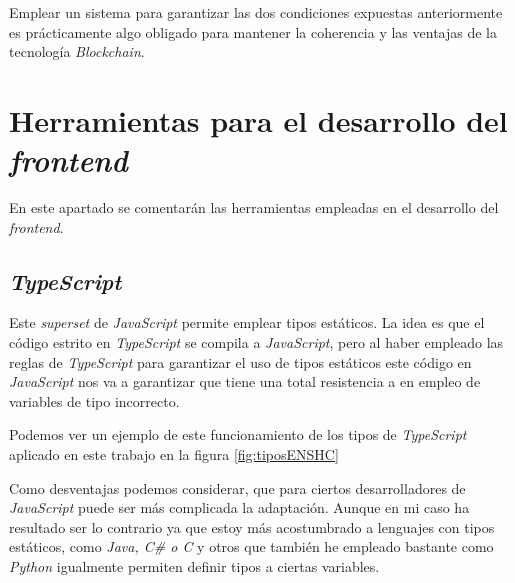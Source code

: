 Emplear un sistema para garantizar las dos condiciones expuestas anteriormente es prácticamente algo obligado para mantener la coherencia y las ventajas de la tecnología \textit{Blockchain}.

\section{Herramientas para el desarrollo del \textit{frontend}}
En este apartado se comentarán las herramientas empleadas en el desarrollo del \textit{frontend}.

\subsection{\textit{TypeScript}}
Este  \textit{superset}\cite{typescriptlangDocumentationBasics} de \textit{JavaScript} permite emplear tipos estáticos. La idea es que el código estrito en \textit{TypeScript} se compila a \textit{JavaScript}, pero al haber empleado las reglas de \textit{TypeScript} para garantizar el uso de tipos estáticos este código en \textit{JavaScript} nos va a garantizar que tiene una total resistencia a en empleo de variables de tipo incorrecto. 


Podemos ver un ejemplo de este funcionamiento de los tipos de \textit{TypeScript} aplicado en este trabajo en la figura \ref{fig:tiposENSHC}

Como desventajas podemos considerar, que para ciertos desarrolladores de  \textit{JavaScript} puede ser más complicada la adaptación. Aunque en mi caso ha resultado ser lo contrario ya que estoy más acostumbrado a lenguajes con tipos estáticos, como \textit{Java, C\# o C} y otros que también he empleado bastante como \textit{Python} igualmente permiten definir tipos a ciertas variables.


